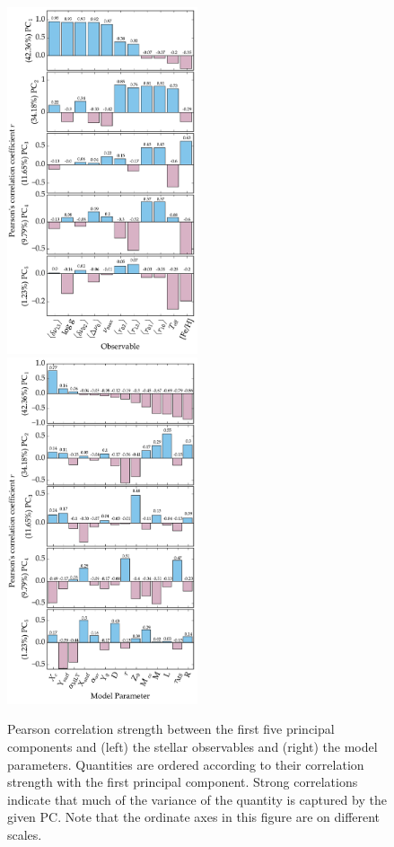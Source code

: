 \iffalse
\begin{figure} \centering
\includegraphics[width=0.5\textwidth]{barchart2a.pdf}%
\includegraphics[width=0.5\textwidth]{barchart3a.pdf}%
\caption{ Pearson correlation strength between the first five principal components and (left) the stellar observables and (right) the model parameters.  Quantities are ordered according to their correlation strength with the first principal component.  Strong correlations indicate that much of the variance of the quantity is captured by the given PC. Note that the ordinate axes in this figure are on different scales. }
\label{fig:GCA-pcabar}
\end{figure}


